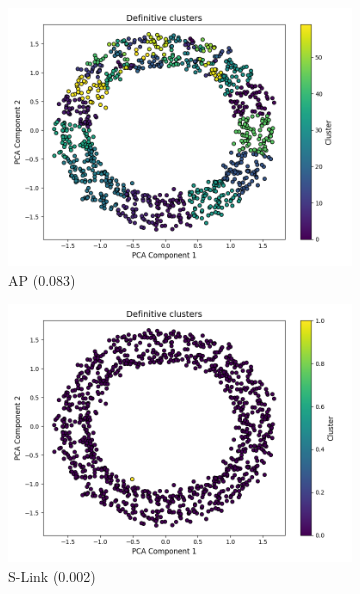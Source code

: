 \documentclass[
	10pt,
	parskip=half-,	
	paper=a4,
	english
	]{scrartcl}
\begin{document}
\begin{figure}[ht]
    \begin{subfigure}[b]{0.3\textwidth}
        \includegraphics[width=\textwidth]{../data/plots/synthetic_noise_circles_circles_AP_structural_0.png}
        \caption{AP (0.083)}
    \end{subfigure}
    \begin{subfigure}[b]{0.3\textwidth}
        \includegraphics[width=\textwidth]{../data/plots/synthetic_noise_circles_circles_S-link_structural_0.png}
        \caption{S-Link (0.002)}
    \end{subfigure}
    \begin{subfigure}[b]{0.3\textwidth}

\end{subfigure}
\end{figure}
\end{document}
